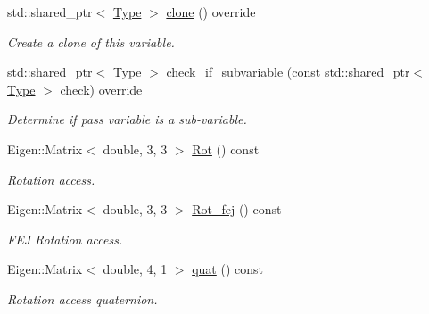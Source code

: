 \begin{DoxyCompactItemize}
\mbox{\label{classov__type_1_1IMU_ab4a7e5d0a12a0f20b2a3a27f61201581}} 
std\+::shared\+\_\+ptr$<$ \hyperlink{classov__type_1_1Type}{Type} $>$ \hyperlink{classov__type_1_1IMU_ab4a7e5d0a12a0f20b2a3a27f61201581}{clone} () override
\begin{DoxyCompactList}\small\item\em Create a clone of this variable. \end{DoxyCompactList}\item 
std\+::shared\+\_\+ptr$<$ \hyperlink{classov__type_1_1Type}{Type} $>$ \hyperlink{classov__type_1_1IMU_a3fb9631390473158abcdf97c71ea6e16}{check\+\_\+if\+\_\+subvariable} (const std\+::shared\+\_\+ptr$<$ \hyperlink{classov__type_1_1Type}{Type} $>$ check) override
\begin{DoxyCompactList}\small\item\em Determine if pass variable is a sub-\/variable. \end{DoxyCompactList}\item 
\mbox{\label{classov__type_1_1IMU_a5bd26c35eb91ab19909579ad51d001a7}} 
Eigen\+::\+Matrix$<$ double, 3, 3 $>$ \hyperlink{classov__type_1_1IMU_a5bd26c35eb91ab19909579ad51d001a7}{Rot} () const
\begin{DoxyCompactList}\small\item\em Rotation access. \end{DoxyCompactList}\item 
\mbox{\label{classov__type_1_1IMU_a08cc1e69a164929553d7f2f78304edd7}} 
Eigen\+::\+Matrix$<$ double, 3, 3 $>$ \hyperlink{classov__type_1_1IMU_a08cc1e69a164929553d7f2f78304edd7}{Rot\+\_\+fej} () const
\begin{DoxyCompactList}\small\item\em F\+EJ Rotation access. \end{DoxyCompactList}\item 
\mbox{\label{classov__type_1_1IMU_a21a9611ca918665d55662e61a8b8464a}} 
Eigen\+::\+Matrix$<$ double, 4, 1 $>$ \hyperlink{classov__type_1_1IMU_a21a9611ca918665d55662e61a8b8464a}{quat} () const
\begin{DoxyCompactList}\small\item\em Rotation access quaternion. \end{DoxyCompactList}\item 

\end{DoxyCompactItemize}
